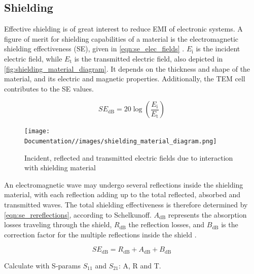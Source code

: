 \subsection{Shielding}

Effective shielding is of great interest to reduce EMI of electronic systems. A figure of merit for shielding capabilities of a material is the electromagnetic shielding effectiveness (SE), given in \autoref{eqn:se_elec_fields} \cite{10518640}. $E_\mathrm{i}$ is the incident electric field, while $E_\mathrm{t}$ is the transmitted electric field, also depicted in \autoref{fig:shielding_material_diagram}. It depends on the thickness and shape of the material, and its electric and magnetic properties. Additionally, the TEM cell contributes to the SE values.


\begin{equation}
    SE_{\mathrm{dB}}=20\log{(\frac{E_\mathrm{i}}{E_\mathrm{t}})}
    \label{eqn:se_elec_fields}
\end{equation}

\begin{figure}[h]
    \centering
    \texttt{[image: Documentation//images/shielding\_material\_diagram.png]}
    \caption{Incident, reflected and transmitted electric fields due to interaction with shielding material}
    \label{fig:shielding_material_diagram}
\end{figure}


An electromagnetic wave may undergo several reflections inside the shielding material, with each reflection adding up to the total reflected, absorbed and transmitted waves. The total shielding effectiveness is therefore determined by \autoref{eqn:se_rereflections}, according to Schelkunoff. $A_{\mathrm{dB}}$ represents the absorption losses traveling through the shield, $R_{\mathrm{dB}}$ the reflection losses, and $B_{\mathrm{dB}}$ is the correction factor for the multiple reflections inside the shield \cite{10518640}.

\begin{equation}
    SE_{\mathrm{dB}}=R_{\mathrm{dB}}+A_{\mathrm{dB}}+B_{\mathrm{dB}}
    \label{eqn:se_rereflections}
\end{equation}

Calculate with S-params $S_{11}$ and $S_{21}$: A, R and T.  


